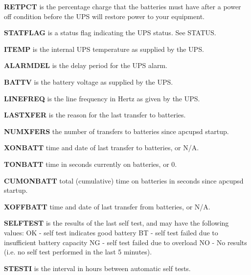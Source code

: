 \begin{description}
\item {\bf RETPCT}
is the percentage charge that the batteries must have after a power off
condition before the UPS will restore power to your equipment.  

\item {\bf STATFLAG}
is a status flag indicating the UPS status. See STATUS.  

\item {\bf ITEMP}
is the internal UPS temperature as supplied by the UPS.  

\item {\bf ALARMDEL}
is the delay period for the UPS alarm.  

\item {\bf BATTV}
is the battery voltage as supplied by the UPS.  

\item {\bf LINEFREQ}
is the line frequency in Hertz as given by the UPS.  

\item {\bf LASTXFER}
is the reason for the last transfer to batteries.  

\item {\bf NUMXFERS}
the number of transfers to batteries since apcupsd startup.  

\item {\bf XONBATT}
time and date of last transfer to batteries, or N/A.  

\item {\bf TONBATT}
time in seconds currently on batteries, or 0.  

\item {\bf CUMONBATT}
total (cumulative) time on batteries in seconds since apcupsd startup.  

\item {\bf XOFFBATT}
time and date of last transfer from batteries, or N/A.  

\item {\bf SELFTEST}
is the results of the last self test, and may have the following values: OK -
self test indicates good battery BT - self test failed due to insufficient
battery capacity NG - self test failed due to overload NO - No results (i.e.
no self test performed in the last 5 minutes).  

\item {\bf STESTI}
is the interval in hours between automatic self tests.  


\end{description}
